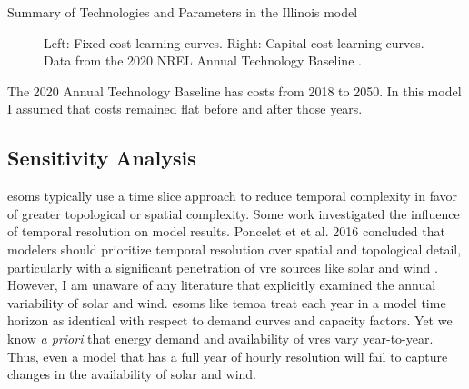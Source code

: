 \begin{table}[H]
  \centering
  \caption{Summary of Technologies and Parameters in the Illinois model}
  \label{tab:il-tech}
  \resizebox{\textwidth}{!}{
  
  } %
\end{table}


\begin{figure}[H]
  \label{fig:costs}
  \begin{minipage}{0.5\textwidth}
    \centering
    \resizebox{\textwidth}{!}{}
  \end{minipage}
  \begin{minipage}{0.5\textwidth}
    \centering
    \resizebox{\textwidth}{!}{}
  \end{minipage}
  \caption{Left: Fixed cost learning curves. Right: Capital cost learning curves.
  Data from the 2020 NREL Annual Technology Baseline \cite{nrel_2020_2020}.}
\end{figure}

The 2020 Annual Technology Baseline has costs from 2018 to 2050. In this model
I assumed that costs remained flat before and after those years.

\subsection{Sensitivity Analysis}

\glspl{esom} typically use a time slice approach to reduce temporal complexity
in favor of greater topological or spatial complexity. Some work investigated the
influence of temporal resolution on model results. Poncelet et et al. 2016
concluded that modelers should prioritize temporal resolution over spatial and
topological detail, particularly with a significant penetration of \gls{vre}
sources like solar and wind \cite{poncelet_impact_2016}. However,
I am unaware of any literature that explicitly examined the annual variability
of solar and wind. \glspl{esom} like \gls{temoa} treat each year in a model
time horizon as identical with respect to demand curves and capacity factors. Yet
we know \textit{a priori} that energy demand and availability of \glspl{vre}
vary year-to-year. Thus, even a model that has a full year of hourly resolution
will fail to capture changes in the availability of solar and wind.

